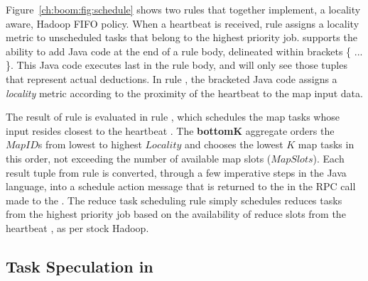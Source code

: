 Figure~\ref{ch:boom:fig:schedule} shows two rules that together implement, a
locality aware, Hadoop FIFO policy.  When a \TT heartbeat is received, rule
 assigns a locality metric to unscheduled tasks that belong to the
highest priority job.  \JOL supports the ability to add Java code at the end of
a rule body, delineated within brackets \{ ...  \}.  This Java code executes
last in the rule body, and will only see those tuples that represent actual
deductions.  In rule , the bracketed Java code assigns a {\em locality}
metric according to the proximity of the heartbeat \TT to the map input data.

The result of rule  is evaluated in rule , which schedules the
map tasks whose input resides closest to the heartbeat \TT.  The {\bf bottomK}
aggregate orders the $MapID$s from lowest to highest $Locality$ and chooses the
lowest $K$ map tasks in this order, not exceeding the number of available map
slots ($MapSlots$).  Each result tuple from rule  is converted, through
a few imperative steps in the Java language, into a schedule action message
that is returned to the \TT in the RPC call made to the \JT.  The reduce task
scheduling rule simply schedules reduces tasks from the highest priority job
based on the availability of reduce slots from the heartbeat \TT, as per stock
Hadoop.

\subsection{Task Speculation in \OVERLOG}
\label{ch:boom:sec:late}

